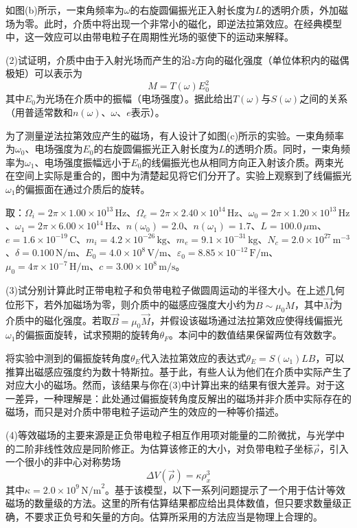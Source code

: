 \documentclass[11pt,a4paper,onecolumn,UTF8]{ctexart}
\begin{document}
	如图(b)所示，一束角频率为$\omega$的右旋圆偏振光正入射长度为$L$的透明介质，外加磁场为零。此时，介质中将出现一个非常小的磁化，即逆法拉第效应。在经典模型中，这一效应可以由带电粒子在周期性光场的驱使下的运动来解释。
	
	(2)试证明，介质中由于入射光场而产生的沿$z$方向的磁化强度（单位体积内的磁偶极矩）可以表示为
	\begin{equation*}
		M=T(\omega)E_0^2
	\end{equation*}
	其中$E_0$为光场在介质中的振幅（电场强度）。据此给出$T(\omega)$与$S(\omega)$之间的关系（用普适常数和$n(\omega)$、$\omega$、$e$表示）。
	
	为了测量逆法拉第效应产生的磁场，有人设计了如图(c)所示的实验。一束角频率为$\omega_0$、电场强度为$E_0$的右旋圆偏振光正入射长度为$L$的透明介质。同时，一束角频率为$\omega_1$、电场强度振幅远小于$E_0$的线偏振光也从相同方向正入射该介质。两束光在空间上实际是重合的，图中为清楚起见将它们分开了。实验上观察到了线偏振光$\omega_1$的偏振面在通过介质后的旋转。
	
	取：$\Omega_i=2\pi\times1.00\times10^{13}\,\text{Hz}$、$\Omega_e=2\pi\times2.40\times10^{14}\,\text{Hz}$、$\omega_0=2\pi\times1.20\times10^{13}\,\text{Hz}$、$\omega_1=2\pi\times6.00\times10^{14}\,\text{Hz}$、$n(\omega_0)=2.0$、$n(\omega_1)=1.7$、$L=100.0\,\mu\text{m}$、$e=1.6\times10^{-19}\,\text{C}$、$m_i=4.2\times10^{-26}\,\text{kg}$、$m_e=9.1\times10^{-31}\,\text{kg}$、$N_c=2.0\times10^{27}\,\text{m}^{-3}$、$\delta=0.100\,\text{N/m}$、$E_0=4.0\times10^8\,\text{V/m}$、$\varepsilon_{0}=8.85\times10^{-12}\,\text{F/m}$、$\mu_0=4\pi\times10^{-7}\,\text{H/m}$、$c=3.00\times10^8\,\text{m/s}$。
	
	(3)试分别计算此时正带电粒子和负带电粒子做圆周运动的半径大小。在上述几何位形下，若外加磁场为零，则介质中的磁感应强度大小约为$B\sim\mu_0M$，其中$\vec M$为介质中的磁化强度。若取$\vec B=\mu_0\vec M$，并假设该磁场通过法拉第效应使得线偏振光$\omega_1$的偏振面旋转，试求预期的旋转角$\theta_F$。本问中的数值结果保留两位有效数字。
	
	将实验中测到的偏振旋转角度$\theta_E$代入法拉第效应的表达式$\theta_E=S(\omega_1)LB$，可以推算出磁感应强度约为数十特斯拉。基于此，有些人认为他们在介质中实际产生了对应大小的磁场。然而，该结果与你在(3)中计算出来的结果有很大差异。对于这一差异，一种理解是：此处通过偏振旋转角度反解出的磁场并非介质中实际存在的磁场，而只是对介质中带电粒子运动产生的效应的一种等价描述。
	
	(4)等效磁场的主要来源是正负带电粒子相互作用项对能量的二阶微扰，与光学中的二阶非线性效应是同阶修正。为估算该修正的大小，对负带电粒子坐标$\vec\rho$，引入一个很小的非中心对称势场
	\begin{equation*}
		\Delta V(\vec\rho)=\kappa\rho_x^3
	\end{equation*}
	其中$\kappa=2.0\times10^9\,\text{N/m}^2$。基于该模型，以下一系列问题提示了一个用于估计等效磁场的数量级的方法。这里的所有估算结果都应给出具体数值，但只要求数量级正确，不要求正负号和矢量的方向。估算所采用的方法应当是物理上合理的。
	
\end{document}
